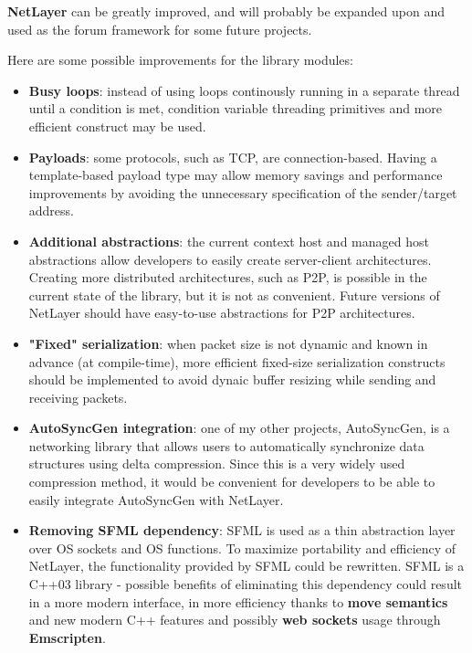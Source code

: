 \documentclass[11pt]{report}
\newcommand{\+}{\discretionary{\mbox{\scriptsize$\hookleftarrow$}}{}{}}
\renewcommand\emph{\textbf}
\begin{document}
        \emph{NetLayer} can be greatly improved, and will probably be expanded upon and used as the forum framework for some future projects.

        Here are some possible improvements for the library modules:

        \begin{itemize}
            \item \emph{Busy loops}: instead of using loops continously running in a separate thread until a condition is met, condition variable threading primitives and more efficient construct may be used.
            
            \item \emph{Payloads}: some protocols, such as TCP, are connection-based. Having a template-based payload type may allow memory savings and performance improvements by avoiding the unnecessary specification of the sender/target address.
            
            \item \emph{Additional abstractions}: the current context host and managed host abstractions allow developers to easily create server-client architectures. Creating more distributed architectures, such as P2P, is possible in the current state of the library, but it is not as convenient. Future versions of NetLayer should have easy-to-use abstractions for P2P architectures.
            
            \item \emph{"Fixed" serialization}: when packet size is not dynamic and known in advance (at compile-time), more efficient fixed-size serialization constructs should be implemented to avoid dynaic buffer resizing while sending and receiving packets.

            \item \emph{AutoSyncGen integration}: one of my other projects, AutoSyncGen, is a networking library that allows users to automatically synchronize data structures using delta compression. Since this is a very widely used compression method, it would be convenient for developers to be able to easily integrate AutoSyncGen with NetLayer.

            \item \emph{Removing SFML dependency}: SFML is used as a thin abstraction layer over OS sockets and OS functions. To maximize portability and efficiency of NetLayer, the functionality provided by SFML could be rewritten. SFML is a C++03 library - possible benefits of eliminating this dependency could result in a more modern interface, in more efficiency thanks to \emph{move semantics} and new modern C++ features and possibly \emph{web sockets} usage through \emph{Emscripten}.


\end{itemize}
\end{document}
